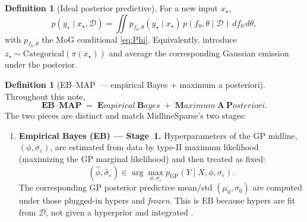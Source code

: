 \documentclass[11pt,a4paper]{article}
\theoremstyle{plain}
\theoremstyle{definition}
\newtheorem{definition}[theorem]{Definition}
\theoremstyle{remark}
\newcommand{\D}{\mathcal{D}}
\newcommand{\tht}{\theta}
\newcommand{\EBMAP}{EB--MAP}
\begin{document}
\begin{definition}[Ideal posterior predictive]
\label{def:bayes-ppd}
For a new input \(x_\star\),
\begin{equation}
  p(y_\star\mid x_\star,\D)
  =
  \iint
  p_{f_0,\tht}(y_\star\mid x_\star)\,
  p(f_0,\tht\mid\D)\,
  df_0\,d\tht,
  \label{eq:bayes-ppd}
\end{equation}
with \(p_{f_0,\tht}\) the MoG conditional \eqref{eq:Phi}.
Equivalently, introduce \(z_\star\sim\mathrm{Categorical}(\pi(x_\star))\) and
average the corresponding Gaussian emission under the posterior.
\end{definition}

\begin{definition}[\EBMAP\ --- empirical Bayes + maximum a posteriori]
\label{def:ebmap}
Throughout this note,
\[
  \boxed{
  \textbf{\EBMAP}
  \;=\;
  \textbf{E}mpirical~\textbf{B}ayes
  \;+\;
  \textbf{M}aximum~\textbf{A}~\textbf{P}osteriori.
  }
\]
The two pieces are distinct and match MidlineSparse's two stages:
\begin{enumerate}[label=(\roman*),leftmargin=1.4em,itemsep=0.35em]
  \item \textbf{Empirical Bayes (EB) --- Stage~1.}
        Hyperparameters of the GP midline, \((\phi,\sigma_\varepsilon)\), are estimated
        from data by type-II maximum likelihood (maximizing the GP marginal
        likelihood) and then treated as fixed:
        \[
          (\hat\phi,\hat\sigma_\varepsilon)
          \in
          \arg\max_{\phi,\sigma_\varepsilon}
          p_{\mathrm{GP}}(Y\mid X,\phi,\sigma_\varepsilon).
        \]
        The corresponding GP posterior predictive mean/std
        \((\mu_0,\sigma_0)\) are computed under those plugged-in hypers and
        \emph{frozen}. This is EB because hypers are fit from \(\D\), not given a
        hyperprior and integrated
        \citep{RasmussenWilliams2006}.


\end{enumerate}
\end{definition}
\end{document}
